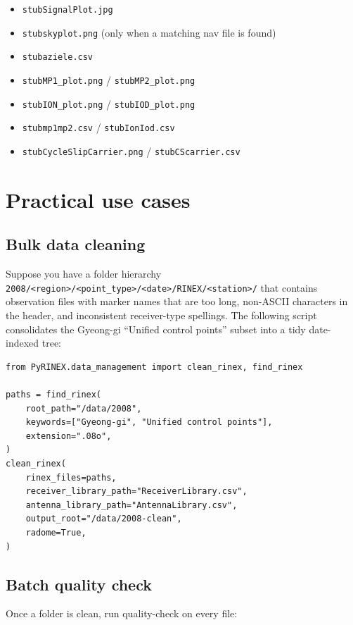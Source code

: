 \documentclass[11pt,a4paper]{article}
\begin{document}
\begin{itemize}
    \item \texttt{stubSignalPlot.jpg}
    \item \texttt{stubskyplot.png} (only when a matching nav file
      is found)
    \item \texttt{stubaziele.csv}
    \item \texttt{stubMP1\_plot.png} / \texttt{stubMP2\_plot.png}
    \item \texttt{stubION\_plot.png} / \texttt{stubIOD\_plot.png}
    \item \texttt{stubmp1mp2.csv} / \texttt{stubIonIod.csv}
    \item \texttt{stubCycleSlipCarrier.png} /
      \texttt{stubCScarrier.csv}
\end{itemize}

\section{Practical use cases}

\subsection{Bulk data cleaning}

Suppose you have a folder hierarchy
\texttt{2008/<region>/<point\_type>/<date>/RINEX/<station>/}
that contains observation files with marker names that are too long,
non-ASCII characters in the header, and inconsistent receiver-type
spellings. The following script consolidates the Gyeong-gi
``Unified control points'' subset into a tidy date-indexed tree:

\begin{lstlisting}
from PyRINEX.data_management import clean_rinex, find_rinex

paths = find_rinex(
    root_path="/data/2008",
    keywords=["Gyeong-gi", "Unified control points"],
    extension=".08o",
)
clean_rinex(
    rinex_files=paths,
    receiver_library_path="ReceiverLibrary.csv",
    antenna_library_path="AntennaLibrary.csv",
    output_root="/data/2008-clean",
    radome=True,
)
\end{lstlisting}

\subsection{Batch quality check}

Once a folder is clean, run quality-check on every file:
\end{document}

